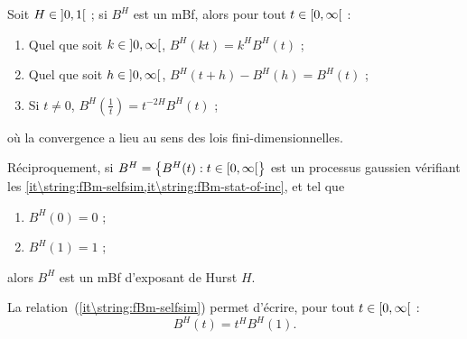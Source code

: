 \begin{proposition}
  Soit $H\in\left]0,1\right[$ ; si $B^H$ est un mBf, alors pour tout
  $t\in\left[0,\infty\right[$ :
  \begin{enumerate}
  \item\label{it\string:fBm-selfsim} Quel que soit $k\in\left]0,\infty\right[$,
    $B^H(kt) = k^HB^H(t)$ ;
  \item\label{it\string:fBm-stat-of-inc} Quel que soit
    $h\in\left]0,\infty\right[$, $B^H(t+h) - B^H(h) = B^H(t)$ ;
  \item\label{it\string:fBm-time-inversion} Si $t\neq 0$,
    $B^H(\frac{1}{t}) = t^{-2H}B^H(t)$ ;
  \end{enumerate}
  où la convergence a lieu au sens des lois fini-dimensionnelles.

  Réciproquement, si
  $B^H=\left\{B^H(t) : t\in\left[0,\infty\right[\right\}$ est un processus
  gaussien vérifiant les
  \cref{it\string:fBm-selfsim,it\string:fBm-stat-of-inc}, et tel que
  \begin{enumerate}[resume]
  \item $B^H(0)=0$ ;
  \item $B^H(1)=1$ ;
  \end{enumerate}
  alors $B^H$ est un mBf d'exposant de Hurst $H$.
\end{proposition}

\begin{remarque}
  \label{rk\string:fBm-selfsim-rephrase}
  La relation~(\ref{it\string:fBm-selfsim}) permet d'écrire, pour tout
  $t\in\left[0,\infty\right[$ : \[ B^H(t) = t^HB^H(1) .\]
\end{remarque}

